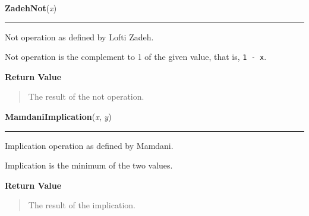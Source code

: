     \label{peach:fuzzy:norms:ZadehNot}

    \vspace{0.5ex}

    \begin{boxedminipage}{\textwidth}

    \raggedright \textbf{ZadehNot}(\textit{x})

    \vspace{-1.5ex}

    \rule{\textwidth}{0.5\fboxrule}

Not operation as defined by Lofti Zadeh.

Not operation is the complement to 1 of the given value, that is, \texttt{1 - x}.
    \vspace{1ex}

      \textbf{Return Value}
      \begin{quote}

The result of the not operation.
      \end{quote}

    \vspace{1ex}

    \end{boxedminipage}

    \label{peach:fuzzy:norms:MamdaniImplication}

    \vspace{0.5ex}

    \begin{boxedminipage}{\textwidth}

    \raggedright \textbf{MamdaniImplication}(\textit{x}, \textit{y})

    \vspace{-1.5ex}

    \rule{\textwidth}{0.5\fboxrule}

Implication operation as defined by Mamdani.

Implication is the minimum of the two values.
    \vspace{1ex}

      \textbf{Return Value}
      \begin{quote}

The result of the implication.
      \end{quote}

    \vspace{1ex}

    \end{boxedminipage}

